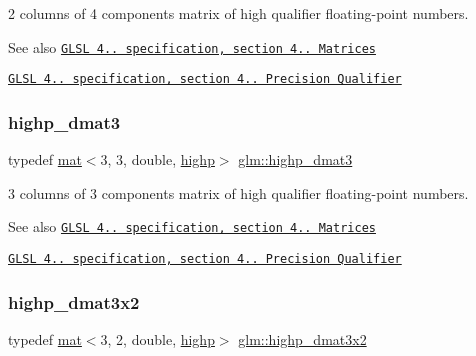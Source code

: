 2 columns of 4 components matrix of high qualifier floating-\/point numbers.

\begin{DoxySeeAlso}{See also}
\href{http://www.opengl.org/registry/doc/GLSLangSpec.4.20.8.pdf}{\tt G\+L\+SL 4.. specification, section 4.. Matrices} 

\href{http://www.opengl.org/registry/doc/GLSLangSpec.4.20.8.pdf}{\tt G\+L\+SL 4.. specification, section 4.. Precision Qualifier} 
\end{DoxySeeAlso}
\mbox{\label{group__core__precision_ga2e305d56d01a4553a7fd2b6d2c580fa0}} 
\subsubsection{\texorpdfstring{highp\+\_\+dmat3}{highp\_dmat3}}
{\footnotesize\ttfamily typedef \mbox{\hyperlink{structglm_1_1mat}{mat}}$<$3, 3, double, \mbox{\hyperlink{namespaceglm_a36ed105b07c7746804d7fdc7cc90ff25ac6f7eab42eacbb10d59a58e95e362074}{highp}}$>$ \mbox{\hyperlink{group__core__precision_ga2e305d56d01a4553a7fd2b6d2c580fa0}{glm\+::highp\+\_\+dmat3}}}

3 columns of 3 components matrix of high qualifier floating-\/point numbers.

\begin{DoxySeeAlso}{See also}
\href{http://www.opengl.org/registry/doc/GLSLangSpec.4.20.8.pdf}{\tt G\+L\+SL 4.. specification, section 4.. Matrices} 

\href{http://www.opengl.org/registry/doc/GLSLangSpec.4.20.8.pdf}{\tt G\+L\+SL 4.. specification, section 4.. Precision Qualifier} 
\end{DoxySeeAlso}
\mbox{\label{group__core__precision_ga8454b92a3917b17a8663f2409cb3100d}} 
\subsubsection{\texorpdfstring{highp\+\_\+dmat3x2}{highp\_dmat3x2}}
{\footnotesize\ttfamily typedef \mbox{\hyperlink{structglm_1_1mat}{mat}}$<$3, 2, double, \mbox{\hyperlink{namespaceglm_a36ed105b07c7746804d7fdc7cc90ff25ac6f7eab42eacbb10d59a58e95e362074}{highp}}$>$ \mbox{\hyperlink{group__core__precision_ga8454b92a3917b17a8663f2409cb3100d}{glm\+::highp\+\_\+dmat3x2}}}

